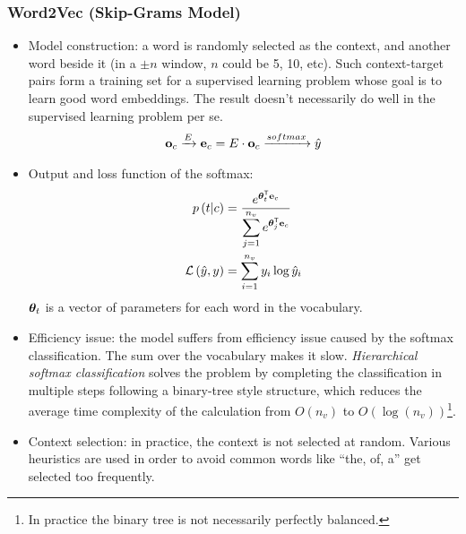 \subsubsection{Word2Vec (Skip-Grams Model)}
\begin{itemize}
  \item Model construction: a word is randomly selected as the context, and another word beside it (in a $\pm n$ window, $n$ could be 5, 10, etc). Such context-target pairs form a training set for a supervised learning problem whose goal is to learn good word embeddings. The result doesn't necessarily do well in the supervised learning problem per se.
\begin{align*}
  \mathbf{o}_{c}\xrightarrow{E}\mathbf{e}_{c}=E\cdot\mathbf{o}_{c}\xrightarrow{softmax}\hat{y}
\end{align*}
\item Output and loss function of the softmax:
\begin{align*}
  p\left(t\vert c\right)&=\frac{e^{\mathbf{\boldsymbol{\theta}}_{t}^{\mathsf{T}}\mathbf{e}_{c}}}{\displaystyle\sum_{j=1}^{n_v}e^{\mathbf{\boldsymbol{\theta}}_{j}^{\mathsf{T}}\mathbf{e}_{c}}}\\
  \mathcal{L}\left(\hat{y},y\right)&=\displaystyle\sum_{i=1}^{n_v}y_i\log\hat{y}_i
\end{align*}
$\mathbf{\boldsymbol{\theta}}_{t}$ is a vector of parameters for each word in the vocabulary.
\item Efficiency issue: the model suffers from efficiency issue caused by the softmax classification. The sum over the vocabulary makes it slow. \textit{Hierarchical softmax classification} solves the problem by completing the classification in multiple steps following a binary-tree style structure, which reduces the average time complexity of the calculation from $O\left(n_v\right)$ to $O\left(\log\left(n_v\right)\right)$\footnote{In practice the binary tree is not necessarily perfectly balanced.}.
\item Context selection: in practice, the context is not selected at random. Various heuristics are used in order to avoid common words like ``the, of, a'' get selected too frequently.
\end{itemize}
